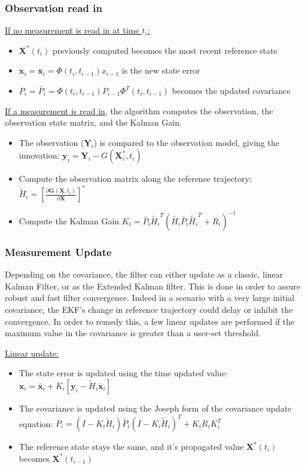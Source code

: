 \documentclass[]{BasiliskReportMemo}
\begin{document}
\subsubsection*{Observation read in}

\underline{If no measurement is read in at time $t_i$:}

\begin{itemize}
\item $\bm X^*(t_i)$ previously computed becomes the most recent reference state
\item $\bm x_i = \bm \bar{x}_i = \Phi(t_{i}, t_{i-1}) x_{i-1}$ is the new state error 
\item $P_i = \bar{P}_i =\Phi(t_{i}, t_{i-1}) P_{i-1} \Phi^T(t_{i}, t_{i-1})$ becomes the updated covariance
\end{itemize}
\underline{If a measurement is read in}, the algorithm computes the observation, the observation state matrix, and the Kalman Gain.

\begin{itemize}
\item The observation ($\bm Y_i$) is compared to the observation model, giving the innovation: $\bm y_i = \bm Y_i - G(\bm X_i^*, t_i)$
\item Compute the observation matrix along the reference trajectory: $\tilde{H}_i = \left[\frac{\partial \bm G (\bm X, t_i)}{\partial \bm X}\right]^{*}$
\item Compute the Kalman Gain $K_i = \bar{P}_i \tilde{H_i}^T\left(\tilde{H_i} \bar{P}_i \tilde{H_i}^T + R_i \right)^{-1}$
\end{itemize}

\subsubsection*{Measurement Update}

Depending on the covariance, the filter can either update as a classic, linear Kalman Filter, or as the Extended Kalman filter.
This is done in order to assure robust and fast filter convergence. Indeed in a scenario with a very large initial covariance, the EKF's
change in reference trajectory could delay or inhibit the convergence. In order to remedy this, a few linear updates are performed if the 
maximum value in the covariance is greater than a user-set threshold.

\underline{Linear update:}

\begin{itemize}
\item The state error is updated using the time updated value: $\bm x_i =  \bm \bar{x}_i + K_i\left[\bm y_i - \tilde{H}_i \bm \bar{x}_i \right]$
\item The covariance is updated using the Joseph form of the covariance update equation:
$P_i = \left( I - K_i \tilde{H}_i\right) \bar{P}_{i} \left( I - K_i \tilde{H}_i\right)^T + K_i R_i K_i^T$
\item The reference state stays the same, and it's propagated value $\bm X^*(t_i)$ becomes $\bm X^*(t_{i-1})$
\end{itemize}
\end{document}
